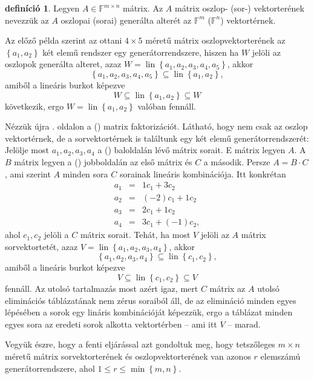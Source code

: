 \documentclass[a4paper, showtrims]{memoir}
\theoremstyle{plain}
\theoremstyle{remark}
\theoremstyle{definition}
\newtheorem{definition}[proposition]{definíció}
\DeclareMathOperator{\lin}{lin}
\begin{document}
\begin{definition}
	Legyen $A\in\mathbb{F}^{m\times n}$ mátrix.
	Az $A$ mátrix oszlop- (sor-) vektorterének nevezzük az $A$ oszlopai (sorai) generálta alterét az $\mathbb{F}^m$ ($\mathbb{F}^n$)
	vektortérnek.
\end{definition}
Az előző példa szerint az ottani $4\times 5$ méretű mátrix oszlopvektorterének az $\left\{ a_1,a_2 \right\}$ két elemű rendszer
egy generátorrendszere, hiszen ha $W$ jelöli az oszlopok generálta alteret, azaz
\(W=\lin\left\{ a_1,a_2,a_3,a_4,a_5 \right\}\), akkor 
\[
    \left\{ a_1,a_2,a_3,a_4,a_5 \right\}\subseteq
    \lin{\left\{ a_1,a_2\right\}},
\]
amiből a lineáris burkot képezve
\[
    W
    \subseteq
    \lin{\left\{ a_1,a_2\right\}}
    \subseteq
    W
\]
következik, ergo $W=\lin\left\{ a_1,a_2 \right\}$ valóban fennáll.

Nézzük újra \aazt{\pageref{bazisfakt}}. oldalon a (\dag) matrix faktorizációt.
Látható, hogy nem csak az oszlop vektortérnek, de a sorvektortérnek is találtunk egy két elemű generátorrendszerét:
Jelölje most $a_1,a_2,a_3,a_4$ a (\dag) baloldalán lévő mátrix sorait.
E mátrix legyen $A$.
A $B$ mátrix legyen a (\dag) jobboldalán az első mátrix és $C$ a második.
Persze $A=B\cdot C$, ami szerint $A$ minden sora $C$ sorainak lineáris kombinációja.
Itt konkrétan
\begin{eqnarray*}
    a_1&=& 1c_1+3c_2\\
    a_2&=& (-2)c_1+1c_2\\
    a_3&=& 2c_1+1c_2\\
    a_4&=& 3c_1+(-1)c_2,
\end{eqnarray*}
ahol $c_1,c_2$ jelöli a $C$ mátrix sorait.
Tehát, ha most $V$ jelöli az $A$ mátrix sorvektortetét, azaz
\(V=\lin\left\{ a_1,a_2,a_3,a_4 \right\}\),
akkor 
\[
    \left\{ a_1,a_2,a_3,a_4 \right\}
    \subseteq
    \lin\left\{ c_1,c_2 \right\},
\]
amiből a lineáris burkot képezve
\[
    V\subseteq\lin\left\{ c_1,c_2 \right\}\subseteq V
\]
fennáll. 
Az utolsó tartalmazás most azért igaz, 
mert $C$ mátrix az $A$ utolsó eliminációs táblázatának nem zérus soraiból áll, 
de az elimináció minden egyes lépésében a sorok egy lináris kombinációját képezzük, 
ergo a táblázat minden egyes sora az eredeti sorok alkotta vektortérben -- ami itt $V$ -- marad.

Vegyük észre, hogy a fenti eljárással azt gondoltuk meg, 
hogy tetszőleges $m\times n$ méretű mátrix
sorvektorterének és oszlopvektorterének van azonos $r$ elemszámú generátorrendszere,
ahol $1\leq r\leq\min\left\{ m,n \right\}$.
\end{document}
